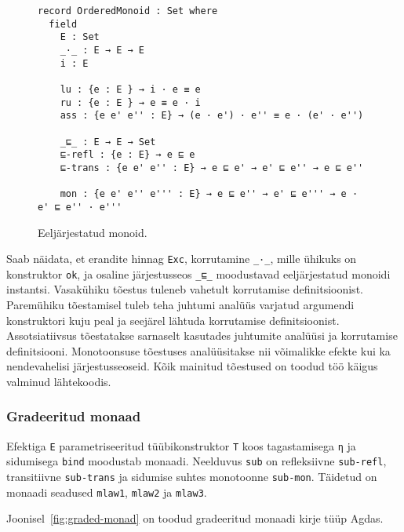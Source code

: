 \documentclass[a4paper,12pt]{article}
\begin{document}
\begin{figure}
  \begin{BVerbatim}
record OrderedMonoid : Set where
  field
    E : Set
    _·_ : E → E → E    
    i : E

    lu : {e : E } → i · e ≡ e
    ru : {e : E } → e ≡ e · i 
    ass : {e e' e'' : E} → (e · e') · e'' ≡ e · (e' · e'')
    
    _⊑_ : E → E → Set    
    ⊑-refl : {e : E} → e ⊑ e
    ⊑-trans : {e e' e'' : E} → e ⊑ e' → e' ⊑ e'' → e ⊑ e''

    mon : {e e' e'' e''' : E} → e ⊑ e'' → e' ⊑ e''' → e · e' ⊑ e'' · e'''
  \end{BVerbatim}
  \caption{Eeljärjestatud monoid.}
  \label{fig:ordered-monoid}
\end{figure}

Saab näidata, et erandite hinnag {\tt Exc},
korrutamine {\tt _·_}, mille ühikuks on konstruktor {\tt ok},
ja osaline järjestusseos {\tt _⊑_} moodustavad eeljärjestatud monoidi instantsi.
Vasakühiku tõestus tuleneb vahetult korrutamise definitsioonist.
Paremühiku tõestamisel tuleb teha juhtumi analüüs varjatud argumendi konstruktori kuju peal
ja seejärel lähtuda korrutamise definitsioonist.
Assotsiatiivsus tõestatakse sarnaselt kasutades juhtumite analüüsi ja korrutamise definitsiooni. Monotoonsuse tõestuses analüüsitakse nii võimalikke efekte kui ka nendevahelisi järjestusseoseid.
Kõik mainitud tõestused on toodud töö käigus valminud lähtekoodis.


\subsubsection{Gradeeritud monaad}\label{sssec:graded-monad}

Efektiga {\tt E} parametriseeritud tüübikonstruktor {\tt T} koos tagastamisega {\tt η} ja sidumisega {\tt bind}  moodustab monaadi.
Neelduvus {\tt sub} on refleksiivne {\tt sub-refl}, transitiivne {\tt sub-trans} ja  sidumise suhtes monotoonne {\tt sub-mon}.
Täidetud on monaadi seadused {\tt mlaw1}, {\tt mlaw2} ja {\tt mlaw3}.

Joonisel~\ref{fig:graded-monad} on toodud gradeeritud monaadi kirje tüüp Agdas.
\end{document}
